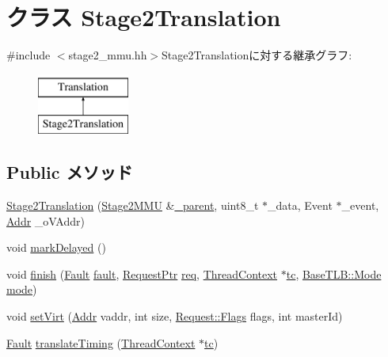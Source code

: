 \hypertarget{classArmISA_1_1Stage2MMU_1_1Stage2Translation}{
\section{クラス Stage2Translation}
\label{classArmISA_1_1Stage2MMU_1_1Stage2Translation}
}


{\ttfamily \#include $<$stage2\_\-mmu.hh$>$}Stage2Translationに対する継承グラフ:\begin{figure}[H]
\begin{center}
\leavevmode
\includegraphics[height=2cm]{classArmISA_1_1Stage2MMU_1_1Stage2Translation}
\end{center}
\end{figure}
\subsection*{Public メソッド}
\begin{DoxyCompactItemize}
\item 
\hyperlink{classArmISA_1_1Stage2MMU_1_1Stage2Translation_adf800121ce2b6492781f7252444b8eff}{Stage2Translation} (\hyperlink{classArmISA_1_1Stage2MMU}{Stage2MMU} \&\hyperlink{classm5_1_1SimObject_1_1SimObject_a8365c86d70a25bb54ee36278d93237a9}{\_\-parent}, uint8\_\-t $\ast$\_\-data, Event $\ast$\_\-event, \hyperlink{classm5_1_1params_1_1Addr}{Addr} \_\-oVAddr)
\item 
void \hyperlink{classArmISA_1_1Stage2MMU_1_1Stage2Translation_ad1fd11d1e352cfc4b329d29b46a19fc4}{markDelayed} ()
\item 
void \hyperlink{classArmISA_1_1Stage2MMU_1_1Stage2Translation_a01e7d945def8d2e5df87a169954fa89f}{finish} (\hyperlink{classRefCountingPtr}{Fault} \hyperlink{classArmISA_1_1Stage2MMU_1_1Stage2Translation_a68714ceb74c60ea7ef5dec335bb6c5d7}{fault}, \hyperlink{classRequest}{RequestPtr} \hyperlink{classArmISA_1_1Stage2MMU_1_1Stage2Translation_a76fdf11ae9d2e0af47b6362edcc4aaef}{req}, \hyperlink{classThreadContext}{ThreadContext} $\ast$\hyperlink{namespaceArmISA_a5aff829af55e65b802d83dfcef4e9dd0}{tc}, \hyperlink{classBaseTLB_a46c8a310cf4c094f8c80e1cb8dc1f911}{BaseTLB::Mode} \hyperlink{namespaceArmISA_a5f3b9b97eb2dfa29d33e74878455f90d}{mode})
\item 
void \hyperlink{classArmISA_1_1Stage2MMU_1_1Stage2Translation_abd5f91bfdaada4162c7e1974268f748a}{setVirt} (\hyperlink{classm5_1_1params_1_1Addr}{Addr} vaddr, int size, \hyperlink{classFlags}{Request::Flags} flags, int masterId)
\item 
\hyperlink{classRefCountingPtr}{Fault} \hyperlink{classArmISA_1_1Stage2MMU_1_1Stage2Translation_a10760907ae83cf02c1bb5cd0eafd6497}{translateTiming} (\hyperlink{classThreadContext}{ThreadContext} $\ast$\hyperlink{namespaceArmISA_a5aff829af55e65b802d83dfcef4e9dd0}{tc})
\end{DoxyCompactItemize}
